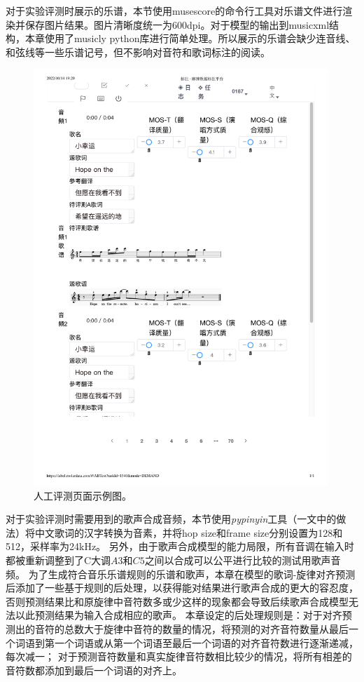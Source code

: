 对于实验评测时展示的乐谱，本节使用musescore的命令行工具对乐谱文件进行渲染并保存图片结果。图片清晰度统一为600dpi。对于模型的输出到musicxml结构，本章使用了musicly python库进行简单处理。所以展示的乐谱会缺少连音线、和弦线等一些乐谱记号，但不影响对音符和歌词标注的阅读。
\begin{figure}[ht]
  \includegraphics[width=0.99\textwidth]{figure/ast/MOS_eval_page.pdf}
  \caption{人工评测页面示例图。}
\end{figure}

对于实验评测时需要用到的歌声合成音频，本节使用\emph{pypinyin}工具（\citet{ren2020deepsinger}一文中的做法）将中文歌词的汉字转换为音素，并将hop size和frame size分别设置为128和512，采样率为24kHz。
另外，由于歌声合成模型的能力局限，所有音调在输入时都被重新调整到了C大调$A3$和$C5$之间以合成可以公平进行比较的测试用歌声音频。
为了生成符合音乐乐谱规则的乐谱和歌声，本章在模型的歌词-旋律对齐预测后添加了一些基于规则的后处理，以获得能对结果进行歌声合成的更大的容忍度，否则预测结果比和原旋律中音符数多或少这样的现象都会导致后续歌声合成模型无法以此预测结果为输入合成相应的歌声。
本章设定的后处理规则是：对于对齐预测出的音符的总数大于旋律中音符的数量的情况，将预测的对齐音符数量从最后一个词语到第一个词语或从第一个词语至最后一个词语的对齐音符数进行逐渐递减，每次减一；
对于预测音符数量和真实旋律音符数相比较少的情况，将所有相差的音符数都添加到最后一个词语的对齐上。
